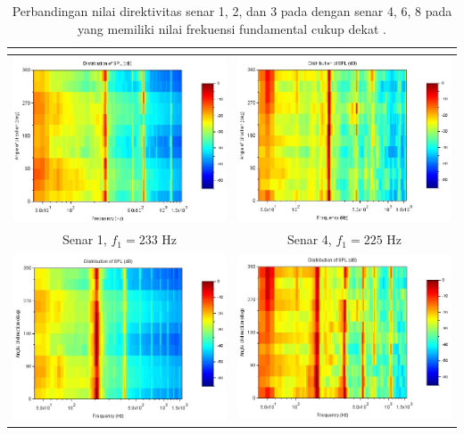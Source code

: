 \begin{table}[t!]
    \centering
    \caption{Perbandingan nilai direktivitas senar 1, 2, dan 3 pada  dengan senar 4, 6, 8 pada  yang memiliki nilai frekuensi fundamental cukup dekat \cite{prosidingDirektivitas}.}
    \begin{tabular}{c c}
        \hline
        \textbf{\Bundengan 1} & \textbf{\Bundengan 2} \\
        \hline
        \includegraphics[width=65mm]{Gambar/senar1yangA.jpg} & \includegraphics[width= 65mm]{Gambar/senar4yangB.jpg}\\
        Senar 1, $f_1=233$ Hz & Senar 4, $f_1=225$ Hz \\
        \hline
        \includegraphics[width=65mm]{Gambar/senar2yangA.jpg} & \includegraphics[width=65mm]{Gambar/senar6yangB.jpg}\\

\end{tabular}
\end{table}
